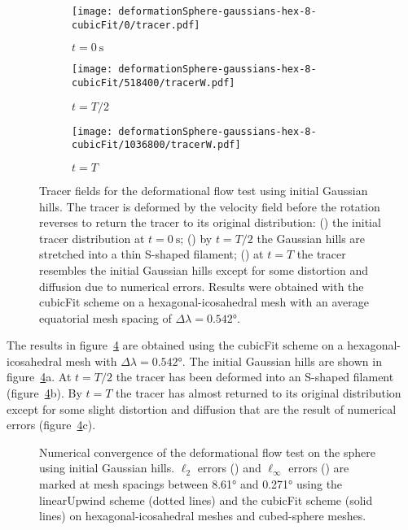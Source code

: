 \begin{figure}
	\centering
	\begin{subfigure}{0.35\textwidth}
		\caption{$t = \SI{0}{\second}$}
		\label{fig:cubicFit:deformationSphere-evolution:initial}
		\texttt{[image: deformationSphere-gaussians-hex-8-cubicFit/0/tracer.pdf]}
	\end{subfigure}
	\begin{subfigure}{0.3\textwidth}
		\caption{$t = T/2$}
		\label{fig:cubicFit:deformationSphere-evolution:mid}
		\texttt{[image: deformationSphere-gaussians-hex-8-cubicFit/518400/tracerW.pdf]}
	\end{subfigure}
	\begin{subfigure}{0.3\textwidth}
		\caption{$t = T$}
		\label{fig:cubicFit:deformationSphere-evolution:final}
		\texttt{[image: deformationSphere-gaussians-hex-8-cubicFit/1036800/tracerW.pdf]}
	\end{subfigure}
%
%
	\caption{Tracer fields for the deformational flow test using initial Gaussian hills.  The tracer is deformed by the velocity field before the rotation reverses to return the tracer to its original distribution:
	() the initial tracer distribution at $t = \SI{0}{\second}$;
	() by $t=T/2$ the Gaussian hills are stretched into a thin S-shaped filament;
	() at $t=T$ the tracer resembles the initial Gaussian hills except for some distortion and diffusion due to numerical errors.  Results were obtained with the cubicFit scheme on a hexagonal-icosahedral mesh with an average equatorial mesh spacing of $\Delta \lambda = \ang{0.542}$.}
	\label{fig:cubicFit:deformationSphere-evolution}
\end{figure}

The results in figure~\ref{fig:cubicFit:deformationSphere-evolution} are obtained using the cubicFit scheme on a hexagonal-icosahedral mesh with $\Delta \lambda = \ang{0.542}$.
The initial Gaussian hills are shown in figure~\ref{fig:cubicFit:deformationSphere-evolution}a.  At $t=T/2$ the tracer has been deformed into an S-shaped filament (figure~\ref{fig:cubicFit:deformationSphere-evolution}b).  By $t=T$ the tracer has almost returned to its original distribution except for some slight distortion and diffusion that are the result of numerical errors (figure~\ref{fig:cubicFit:deformationSphere-evolution}c).

\begin{figure}
	\centering
	
	\caption{Numerical convergence of the deformational flow test on the sphere using initial Gaussian hills.  $\ell_2$ errors () and $\ell_\infty$ errors () are marked at mesh spacings between \ang{8.61} and \ang{0.271} using the linearUpwind scheme (dotted lines) and the cubicFit scheme (solid lines) on hexagonal-icosahedral meshes and cubed-sphere meshes.}
	\label{fig:cubicFit:deformationSphere-gaussian-convergence}
\end{figure}

